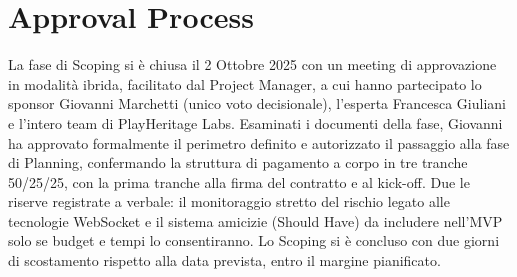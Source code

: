 \section{Approval Process}

La fase di Scoping si è chiusa il 2 Ottobre 2025 con un meeting di approvazione in modalità ibrida, facilitato dal Project Manager, a cui hanno partecipato lo sponsor Giovanni Marchetti (unico voto decisionale), l'esperta Francesca Giuliani e l'intero team di PlayHeritage Labs. Esaminati i documenti della fase, Giovanni ha approvato formalmente il perimetro definito e autorizzato il passaggio alla fase di Planning, confermando la struttura di pagamento a corpo in tre tranche 50/25/25, con la prima tranche alla firma del contratto e al kick-off. Due le riserve registrate a verbale: il monitoraggio stretto del rischio legato alle tecnologie WebSocket e il sistema amicizie (Should Have) da includere nell'MVP solo se budget e tempi lo consentiranno. Lo Scoping si è concluso con due giorni di scostamento rispetto alla data prevista, entro il margine pianificato.
